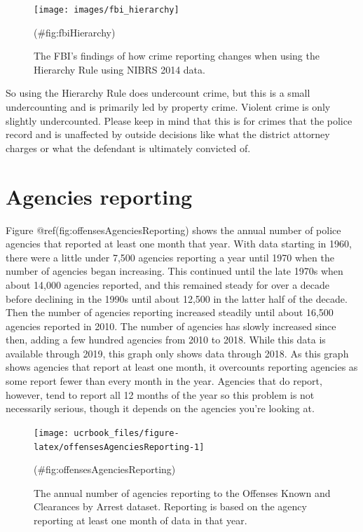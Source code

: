 \documentclass[
  12pt,
  openany]{book}
\begin{document}
\begin{figure}

{\centering \texttt{[image: images/fbi\_hierarchy]} 

}

\caption{The FBI's findings of how crime reporting changes when using the Hierarchy Rule using NIBRS 2014 data.}(\#fig:fbiHierarchy)
\end{figure}

So using the Hierarchy Rule does undercount crime, but this is a small undercounting and is primarily led by property crime. Violent crime is only slightly undercounted. Please keep in mind that this is for crimes that the police record and is unaffected by outside decisions like what the district attorney charges or what the defendant is ultimately convicted of.

\hypertarget{agencies-reporting}{%
\section{Agencies reporting}\label{agencies-reporting}}

Figure @ref(fig:offensesAgenciesReporting) shows the annual number of police agencies that reported at least one month that year. With data starting in 1960, there were a little under 7,500 agencies reporting a year until 1970 when the number of agencies began increasing. This continued until the late 1970s when about 14,000 agencies reported, and this remained steady for over a decade before declining in the 1990s until about 12,500 in the latter half of the decade. Then the number of agencies reporting increased steadily until about 16,500 agencies reported in 2010. The number of agencies has slowly increased since then, adding a few hundred agencies from 2010 to 2018. While this data is available through 2019, this graph only shows data through 2018. As this graph shows agencies that report at least one month, it overcounts reporting agencies as some report fewer than every month in the year. Agencies that do report, however, tend to report all 12 months of the year so this problem is not necessarily serious, though it depends on the agencies you're looking at.

\begin{figure}

{\centering \texttt{[image: ucrbook\_files/figure-latex/offensesAgenciesReporting-1]} 

}

\caption{The annual number of agencies reporting to the Offenses Known and Clearances by Arrest dataset. Reporting is based on the agency reporting at least one month of data in that year.}(\#fig:offensesAgenciesReporting)
\end{figure}
\end{document}
